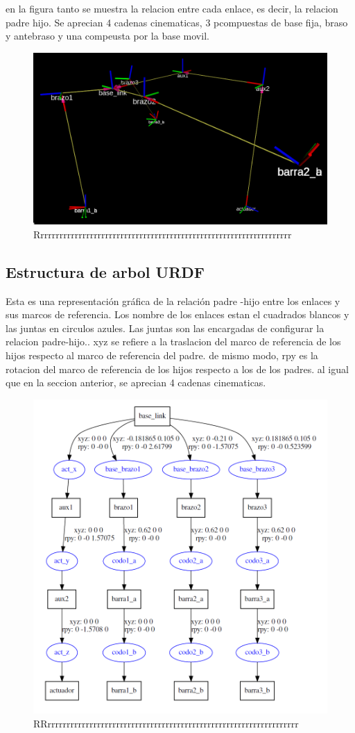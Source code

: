     en la figura tanto se muestra la relacion entre cada enlace, es decir, la relacion padre hijo. Se aprecian 4 cadenas cinematicas, 3 pcompuestas de base fija, braso y antebraso y una compeusta por la base movil.    
    \begin{figure}[h]
            \centering
            \includegraphics[width=0.6\linewidth]{Main/Chapter7/Images7/rviz_3.png}
            \caption{Rrrrrrrrrrrrrrrrrrrrrrrrrrrrrrrrrrrrrrrrrrrrrrrrrrrrrrrrrrrrrrrrrrr}
            \label{f:cap7_rviz_3}
        \end{figure}  

\newpage

    \subsection{Estructura de arbol URDF}
    Esta es una representación gráfica de la relación padre -hijo entre los enlaces y sus marcos de referencia. Los nombre de los enlaces estan el cuadrados blancos y las juntas en circulos azules. Las juntas son las encargadas de configurar la relacion padre-hijo.. xyz se refiere a la traslacion del marco de referencia de los hijos respecto al marco de referencia del padre. de mismo modo, rpy es la rotacion del marco de referencia de los hijos respecto a los de los padres. al igual que en la seccion anterior, se aprecian 4 cadenas cinematicas.

        \begin{figure}[h]
            \centering
            \includegraphics[width=0.8\linewidth]{Main/Chapter7/Images7/rviz_1.png}
            \caption{RRrrrrrrrrrrrrrrrrrrrrrrrrrrrrrrrrrrrrrrrrrrrrrrrrrrrrrrrrrrrrrrrrrr}
            \label{f:cap7_rviz_12341}
        \end{figure}  
    
